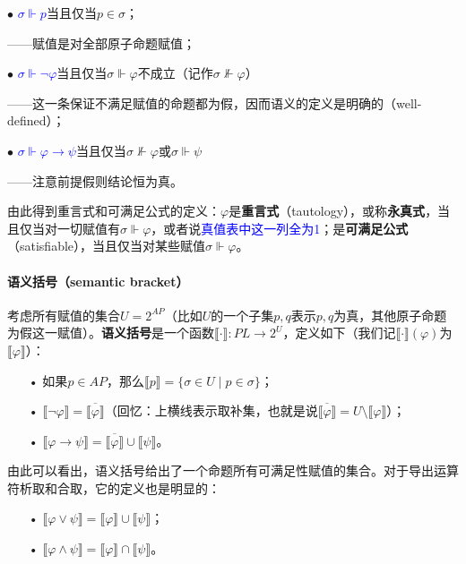 \documentclass[b5paper,oneside]{ctexbook}
\newcommand{\Blue}[1]{\textcolor[named]{blue}{#1}}
\begin{document}
$\bullet$ \Blue{$\sigma\Vdash p$}当且仅当$p\in\sigma$；

——赋值是对全部原子命题赋值；

$\bullet$ \Blue{$\sigma\Vdash \neg\varphi$}当且仅当$\sigma\Vdash\varphi$不成立（记作$\sigma\not\Vdash\varphi$）

——这一条保证不满足赋值的命题都为假，因而语义的定义是明确的（well-defined）；

$\bullet$ \Blue{$\sigma\Vdash\varphi\rightarrow\psi$}当且仅当$\sigma\not\Vdash\varphi$或$\sigma\Vdash\psi$

——注意前提假则结论恒为真。

由此得到重言式和可满足公式的定义：$\varphi$是\textbf{重言式}（tautology），或称\textbf{永真式}，当且仅当对一切赋值有$\sigma\Vdash\varphi$，或者说\Blue{真值表中这一列全为1}；是\textbf{可满足公式}（satisfiable），当且仅当对某些赋值$\sigma\Vdash\varphi$。

\paragraph{语义括号（semantic bracket）}考虑所有赋值的集合$U=2^{AP}$（比如$U$的一个子集$p,q$表示$p,q$为真，其他原子命题为假这一赋值）。\textbf{语义括号}是一个函数$\llbracket\cdot\rrbracket\colon PL\rightarrow 2^U$，定义如下（我们记$\llbracket\cdot\rrbracket (\varphi )$为$\llbracket \varphi\rrbracket$）：
\begin{enumerate}
\item[•]如果$p\in AP$，那么$\llbracket p\rrbracket =\{\sigma\in U\mid p\in\sigma\}$；
\item[•]$\llbracket\neg\varphi\rrbracket=\overline{\llbracket\varphi\rrbracket}$（回忆：上横线表示取补集，也就是说$\overline{\llbracket\varphi\rrbracket}=U\setminus \llbracket\varphi\rrbracket$）；
\item[•]$\llbracket\varphi\to\psi\rrbracket =\overline{\llbracket\varphi\rrbracket}\cup\llbracket\psi\rrbracket$。
\end{enumerate}

由此可以看出，语义括号给出了一个命题所有可满足性赋值的集合。对于导出运算符析取和合取，它的定义也是明显的：
\begin{enumerate}
\item[•]$\llbracket\varphi\lor\psi\rrbracket =\llbracket\varphi\rrbracket\cup\llbracket\psi\rrbracket$；
\item[•]$\llbracket\varphi\land\psi\rrbracket =\llbracket\varphi\rrbracket\cap\llbracket\psi\rrbracket$。
\end{enumerate}
\end{document}
